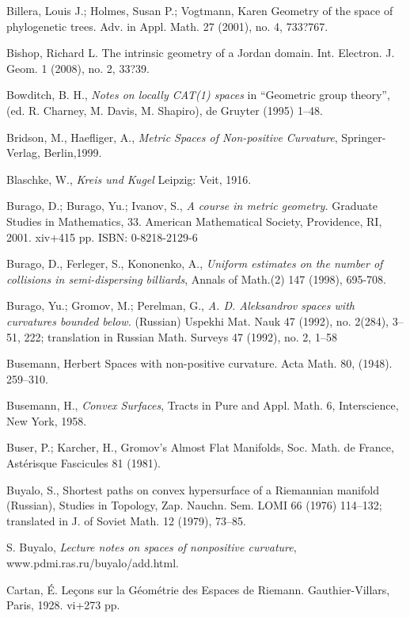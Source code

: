 \begin{thebibliography}{52}
 Billera, Louis J.; Holmes, Susan P.; Vogtmann, Karen Geometry of the space of phylogenetic trees. Adv. in Appl. Math. 27 (2001), no. 4, 733?767.

Bishop, Richard L. The intrinsic geometry of a Jordan domain. Int. Electron. J. Geom. 1 (2008), no. 2, 33?39.

 Bowditch, B. H.,
\textit{Notes on locally CAT(1) spaces} 
in ``Geometric group theory'', (ed. R. Charney, M. Davis, M. Shapiro), de Gruyter (1995) 1--48.

Bridson, M., Haefliger, A.,
\textit{Metric Spaces of Non-positive Curvature},
Springer-Verlag, Berlin,1999.

 Blaschke, W., \textit{Kreis und Kugel} Leipzig: Veit, 1916.

 Burago, D.; Burago, Yu.; Ivanov, S., \textit{A course in metric geometry.} Graduate Studies in Mathematics, 33. American Mathematical Society, Providence, RI, 2001. xiv+415 pp. ISBN: 0-8218-2129-6

Burago, D., Ferleger, S., Kononenko, A.,
\textit{Uniform estimates on the number of collisions in semi-dispersing
billiards},
Annals of Math.(2) 147 (1998), 695-708.


 Burago, Yu.; Gromov, M.; Perelman, G., \textit{A. D. Aleksandrov spaces
with curvatures bounded below.} (Russian)  Uspekhi Mat. Nauk  47  (1992),  no.
2(284), 3--51, 222;  translation in  Russian Math. Surveys  47  (1992),  no. 2, 1--58

Busemann, Herbert 
Spaces with non-positive curvature. Acta Math. 80, (1948). 259--310.


 Busemann, H., \textit{Convex Surfaces}, Tracts in Pure and Appl. Math. 6, Interscience, New York, 1958.

 Buser, P.; Karcher, H.,
Gromov's Almost Flat Manifolds,
Soc. Math. de France, Ast\'erisque Fascicules
81 (1981). 

 Buyalo, S., Shortest paths on convex
hypersurface of a Riemannian manifold (Russian), Studies in Topology, Zap. Nauchn. Sem.
LOMI 66 (1976) 114--132; translated in J. of Soviet Math. 12 (1979), 73--85.

S. Buyalo,
{\em Lecture notes on spaces of nonpositive curvature},
www.pdmi.ras.ru/buyalo/add.html.

Cartan, \'E.
Le\c{c}ons sur la G\'eom\'etrie des Espaces de Riemann. 
Gauthier-Villars, Paris, 1928. vi+273 pp.



\end{thebibliography}
